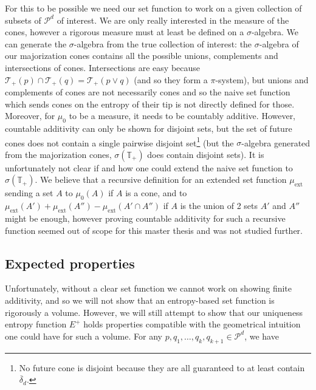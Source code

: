 For this to be possible we need our set function to work on a given collection of subsets of $\mathcal{P}^d$ of interest. We are only really interested in the measure of the cones, however a rigorous measure must at least be defined on a $\sigma$-algebra. We can generate the $\sigma$-algebra from the true collection of interest: the $\sigma$-algebra of our majorization cones contains all the possible unions, complements and intersections of cones. Intersections are easy because $\mathcal{T}_+(p) \cap \mathcal{T}_+(q) = \mathcal{T}_+(p \vee q)$ (and so they form a $\pi$-system), but unions and complements of cones are not necessarily cones and so the naive set function which sends cones on the entropy of their tip is not directly defined for those. Moreover, for $\mu_0$ to be a measure, it needs to be countably additive. However, countable additivity can only be shown for disjoint sets, but the set of future cones does not contain a single pairwise disjoint set\footnote{No future cone is disjoint because they are all guaranteed to at least contain $\overline{\delta}_d$.} (but the $\sigma$-algebra generated from the majorization cones, $\sigma(\mathbb{T_+})$ does contain disjoint sets). It is unfortunately not clear if and how one could extend the naive set function to $\sigma(\mathbb{T_+})$. We believe that a recursive definition for an extended set function $\mu_{\text{ext}}$ sending a set $A$ to $\mu_0(A)$ if $A$ is a cone, and to $\mu_{\text{ext}}(A') +\mu_{\text{ext}}(A'') - \mu_{\text{ext}}(A' \cap A'')$ if $A$ is the union of 2 sets $A'$ and $A''$ might be enough, however proving countable additivity for such a recursive function seemed out of scope for this master thesis and was not studied further.



\subsection{Expected properties} \label{sec:unique_entropy_properties}

Unfortunately, without a clear set function we cannot work on showing finite additivity, and so we will not show that an entropy-based set function is rigorously a volume. However, we will still attempt to show that our uniqueness entropy function $E^+$ holds properties compatible with the geometrical intuition one could have for such a volume. For any $p, q_1, \dots, q_k, q_{k+1} \in \mathcal{P}^d$, we have

